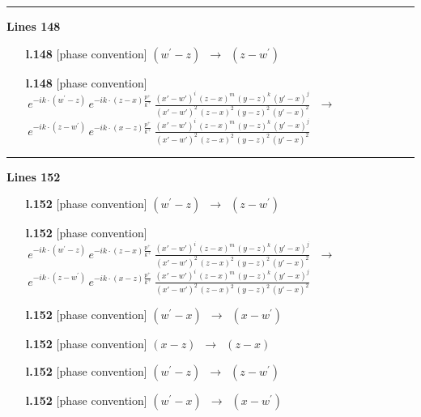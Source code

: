 \documentclass[10pt]{article}
\begin{document}
\noindent\rule{\linewidth}{0.3pt}\par\noindent\textbf{Lines 148} \par
\begin{itemize}[leftmargin=2.2em,itemsep=1pt,topsep=2pt]
\item[\textbf{l.148}] \textsf{\small [phase convention]} $\displaystyle (w^\prime-z)$\ $\longrightarrow$\ $\displaystyle (z-w^\prime)$
\item[\textbf{l.148}] \textsf{\small [phase convention]} $\displaystyle \,e^{-ik\cdot (w^\prime-z)}\,e^{-ik\cdot (z-x)\frac{p^{+}}{k^{+}}}\,\frac{(x'-w')^{i}\,(z-x)^{m}\,(y-z)^{k}\,(y'-x)^{j}}{(x'-w')^{2}\,(z-x)^{2}\,(y-z)^{2}\,(y'-x)^{2}}\,$\ $\longrightarrow$\ $\displaystyle \,e^{-ik\cdot (z-w^\prime)}\,e^{-ik\cdot (x-z)\frac{p^{+}}{k^{+}}}\,\frac{(x'-w')^{i}\,(z-x)^{m}\,(y-z)^{k}\,(y'-x)^{j}}{(x'-w')^{2}\,(z-x)^{2}\,(y-z)^{2}\,(y'-x)^{2}}\,$
\end{itemize}
\noindent\rule{\linewidth}{0.3pt}\par\noindent\textbf{Lines 152} \par
\begin{itemize}[leftmargin=2.2em,itemsep=1pt,topsep=2pt]
\item[\textbf{l.152}] \textsf{\small [phase convention]} $\displaystyle (w^\prime-z)$\ $\longrightarrow$\ $\displaystyle (z-w^\prime)$
\item[\textbf{l.152}] \textsf{\small [phase convention]} $\displaystyle \,e^{-ik\cdot (w^\prime-z)}\,e^{-ik\cdot (z-x)\frac{p^{+}}{k^{+}}}\,\frac{(x'-w')^{i}\,(z-x)^{m}\,(y-z)^{k}\,(y'-x)^{j}}{(x'-w')^{2}\,(z-x)^{2}\,(y-z)^{2}\,(y'-x)^{2}}\,$\ $\longrightarrow$\ $\displaystyle \,e^{-ik\cdot (z-w^\prime)}\,e^{-ik\cdot (x-z)\frac{p^{+}}{k^{+}}}\,\frac{(x'-w')^{i}\,(z-x)^{m}\,(y-z)^{k}\,(y'-x)^{j}}{(x'-w')^{2}\,(z-x)^{2}\,(y-z)^{2}\,(y'-x)^{2}}\,$
\item[\textbf{l.152}] \textsf{\small [phase convention]} $\displaystyle (w^\prime-x)$\ $\longrightarrow$\ $\displaystyle (x-w^\prime)$
\item[\textbf{l.152}] \textsf{\small [phase convention]} $\displaystyle (x-z)$\ $\longrightarrow$\ $\displaystyle (z-x)$
\item[\textbf{l.152}] \textsf{\small [phase convention]} $\displaystyle (w^\prime-z)$\ $\longrightarrow$\ $\displaystyle (z-w^\prime)$
\item[\textbf{l.152}] \textsf{\small [phase convention]} $\displaystyle (w^\prime-x)$\ $\longrightarrow$\ $\displaystyle (x-w^\prime)$
\end{itemize}
\end{document}
